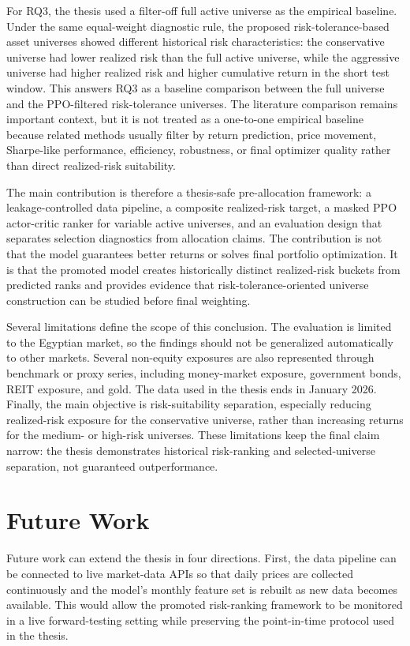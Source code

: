 For RQ3, the thesis used a filter-off full active universe as the empirical baseline. Under the same equal-weight diagnostic rule, the proposed risk-tolerance-based asset universes showed different historical risk characteristics: the conservative universe had lower realized risk than the full active universe, while the aggressive universe had higher realized risk and higher cumulative return in the short test window. This answers RQ3 as a baseline comparison between the full universe and the PPO-filtered risk-tolerance universes. The literature comparison remains important context, but it is not treated as a one-to-one empirical baseline because related methods usually filter by return prediction, price movement, Sharpe-like performance, efficiency, robustness, or final optimizer quality rather than direct realized-risk suitability.

The main contribution is therefore a thesis-safe pre-allocation framework: a leakage-controlled data pipeline, a composite realized-risk target, a masked PPO actor-critic ranker for variable active universes, and an evaluation design that separates selection diagnostics from allocation claims. The contribution is not that the model guarantees better returns or solves final portfolio optimization. It is that the promoted model creates historically distinct realized-risk buckets from predicted ranks and provides evidence that risk-tolerance-oriented universe construction can be studied before final weighting.

Several limitations define the scope of this conclusion. The evaluation is limited to the Egyptian market, so the findings should not be generalized automatically to other markets. Several non-equity exposures are also represented through benchmark or proxy series, including money-market exposure, government bonds, REIT exposure, and gold. The data used in the thesis ends in January 2026. Finally, the main objective is risk-suitability separation, especially reducing realized-risk exposure for the conservative universe, rather than increasing returns for the medium- or high-risk universes. These limitations keep the final claim narrow: the thesis demonstrates historical risk-ranking and selected-universe separation, not guaranteed outperformance.

\section{Future Work}
\label{sec:future_work}

Future work can extend the thesis in four directions. First, the data pipeline can be connected to live market-data APIs so that daily prices are collected continuously and the model's monthly feature set is rebuilt as new data becomes available. This would allow the promoted risk-ranking framework to be monitored in a live forward-testing setting while preserving the point-in-time protocol used in the thesis.

